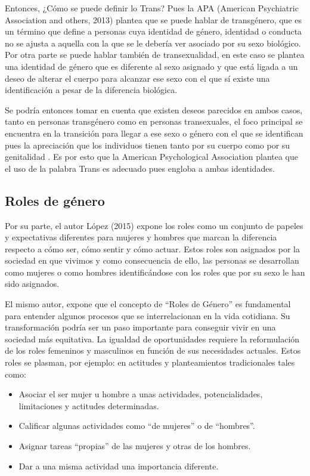 Entonces, ¿Cómo se puede definir lo Trans? Pues la APA (American Psychiatric
Association and others, 2013) plantea que se puede hablar de transgénero, que es
un término que define a personas cuya identidad de género, identidad o conducta
no se ajusta a aquella con la que se le debería ver asociado por su sexo
biológico.
Por otra parte se puede hablar también de transexualidad, en este caso se
plantea una identidad de género que es diferente al sexo asignado y que está
ligada a un deseo de alterar el cuerpo para alcanzar ese sexo con el que sí
existe una identificación a pesar de la diferencia biológica.

Se podría entonces tomar en cuenta que existen deseos parecidos en ambos casos,
tanto en personas transgénero como en personas transexuales, el foco principal
se encuentra en la transición para llegar a ese sexo o género con el que se
identifican pues la apreciación que los individuos tienen tanto por su cuerpo
como por su genitalidad .
Es por esto que la American Psychological Association plantea que el uso de la
palabra Trans es adecuado pues engloba a ambas identidades.

\subsection{Roles de género}
Por su parte, el autor López (2015) expone los roles como un conjunto de papeles
y expectativas diferentes para mujeres y hombres que marcan la diferencia
respecto a cómo ser, cómo sentir y cómo actuar.
Estos roles son asignados por la sociedad en que vivimos y como consecuencia de
ello, las personas se desarrollan como mujeres o como hombres identificándose
con los roles que por su sexo le han sido asignados.

El mismo autor, expone que el concepto de “Roles de Género” es fundamental para
entender algunos procesos que se interrelacionan en la vida cotidiana.
Su transformación podría ser un paso importante para conseguir vivir en una
sociedad más equitativa.
La igualdad de oportunidades requiere la reformulación de los roles femeninos y
masculinos en función de sus necesidades actuales.
Estos roles se plasman, por ejemplo: en actitudes y planteamientos tradicionales
tales como:

\begin{itemize}
    \item Asociar el ser mujer u hombre a unas actividades, potencialidades,
    limitaciones y actitudes determinadas.
    \item Calificar algunas actividades como “de mujeres” o de “hombres”.
    \item Asignar tareas “propias” de las mujeres y otras de los hombres.
    \item Dar a una misma actividad una importancia diferente.
\end{itemize}

